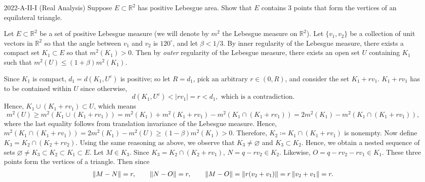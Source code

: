 \documentclass{article}
\begin{document}
\begin{prb}{2022-A-II-I (Real Analysis)}
	Suppose $E \subset \mathbb{R}^{2}$ has positive Lebesgue area. Show that $E$ contains 3 points that form the vertices of an equilateral triangle. 
\end{prb}
\begin{solutions}
	Let $E \subset \mathbb{R}^{2}$ be a set of positive Lebesgue measure (we will denote by $m^{2}$ the Lebesgue measure on $\mathbb{R}^{2}$). Let $\{v_{1}, v_{2}\}$ be a collection of unit vectors in $\mathbb{R}^{2}$ so that the angle between $v_{1}$ and $v_{2}$ is $120^{\circ}$, and let $\beta < 1/3$. By inner regularity of the Lebesgue measure, there exists a compact set $K_{1} \subset E$ so that $m^{2}(K_{1}) > 0$. Then by \textit{outer} regularity of the Lebesgue measure, there exists an open set $U$ containing $K_{1}$ such that $m^{2}(U) \leq (1 + \beta)m^{2}(K_{1})$. 
	
	Since $K_{1}$ is compact, $d_{1} = d(K_{1}, U^{c})$ is positive; so let $R = d_{1}$, pick an arbitrary $r \in (0, R)$, and consider the set $K_{1} + rv_{1}$. $K_{1} + rv_{1}$ has to be contained within $U$ since otherwise, 
		\begin{equation}
			d(K_{1}, U^{c}) < |rv_{1}| = r < d_{1}, \text{ which is a contradiction.}
		\end{equation}
	Hence, $K_{1} \cup (K_{1} + rv_{1}) \subset U$, which means 
		\begin{equation}
			m^{2}(U) \geq m^{2}(K_{1}\cup (K_{1} + rv_{1})) = m^{2}(K_{1}) + m^{2}(K_{1} + rv_{1}) - m^{2}(K_{1} \cap (K_{1} + rv_{1})) = 2m^{2}(K_{1}) - m^{2}(K_{1} \cap (K_{1} + rv_{1})), 
		\end{equation}
	where the last equality follows from translation invariance of the Lebesgue measure. Hence, $m^{2}(K_{1} \cap (K_{1} + rv_{1})) = 2m^{2}(K_{1}) - m^{2}(U) \geq (1 -\beta)m^{2}(K_{1}) > 0$. Therefore, $K_{2} \coloneqq K_{1}\cap (K_{1} + rv_{1})$ is nonempty. Now define $K_{3} = K_{2} \cap (K_{2} + rv_{2})$. Using the same reasoning as above, we observe that $K_{3}\neq \varnothing$ and $K_{3} \subset K_{2}$. Hence, we obtain a nested sequence of sets $\varnothing \neq K_{3} \subset K_{2} \subset K_{1} \subset E$. Let $M \in K_{3}$. Since $K_{3} = K_{2} \cap (K_{2} + rv_{1})$, $N = q - rv_{2} \in K_{2}$. Likewise, $O = q - rv_{2} - rv_{1} \in K_{1}$. These three points form the vertices of a triangle. Then since 
		\begin{align}
			\begin{split}
				\left\Vert M - N \right\Vert = r, \qquad \left\Vert N - O \right\Vert = r, \qquad \left\Vert M - O \right\Vert = \left\Vert r(v_{2} + v_{1}) \right\Vert = r \left\Vert v_{2} + v_{1} \right\Vert = r. 
			\end{split}
		\end{align}
\end{solutions}
\end{document}
